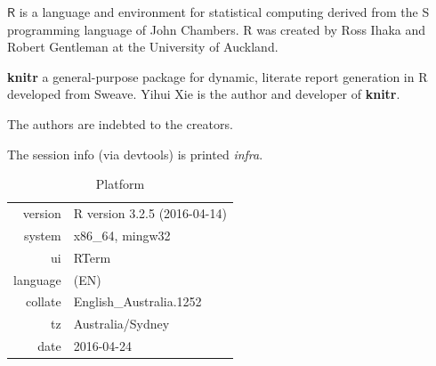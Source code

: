 \begin{subappendices}
$\mathsf{R}$ is a language and environment for statistical computing derived from the S programming language of John Chambers. R was created by Ross Ihaka and Robert Gentleman at the University of Auckland. 

\textbf{knitr} a general-purpose package for dynamic, literate report generation in R developed from Sweave. Yihui Xie is the author and developer of \textbf{knitr}. 

The authors are indebted to the creators.

The session info (via devtools) is printed \emph{infra}.



\begin{table}[!htb]
\centering
\caption{Platform}
\begin{tabular}{rl}
  \toprule
 version & R version 3.2.5 (2016-04-14) \\ 
  system & x86\_64, mingw32 \\ 
  ui & RTerm \\ 
  language & (EN) \\ 
  collate & English\_Australia.1252 \\ 
  tz & Australia/Sydney \\ 
  date & 2016-04-24 \\ 
   \bottomrule
\end{tabular}

\end{table}

\onecolumn



\end{subappendices}
